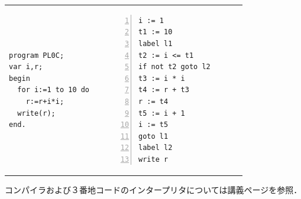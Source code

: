 \documentclass[dvipdfmx,a4j]{jbook}
\begin{document}
\vspace*{10pt}

\begin{tabular}{lll}
    \begin{minipage}{.3\linewidth}
\begin{Verbatim}[frame=single]
program PL0C;
var i,r;
begin
  for i:=1 to 10 do
    r:=r+i*i;
  write(r);
end.
\end{Verbatim}
    \end{minipage}
    & \hspace*{1cm} &
\begin{minipage}{.3\linewidth}
\begin{Verbatim}[numbers=left]
i := 1
t1 := 10
label l1
t2 := i <= t1
if not t2 goto l2
t3 := i * i
t4 := r + t3
r := t4
t5 := i + 1
i := t5
goto l1
label l2
write r
\end{Verbatim}
\end{minipage}
\end{tabular}

\vspace*{20pt}

コンパイラおよび３番地コードのインタープリタについては講義ページを参照．
\end{document}
